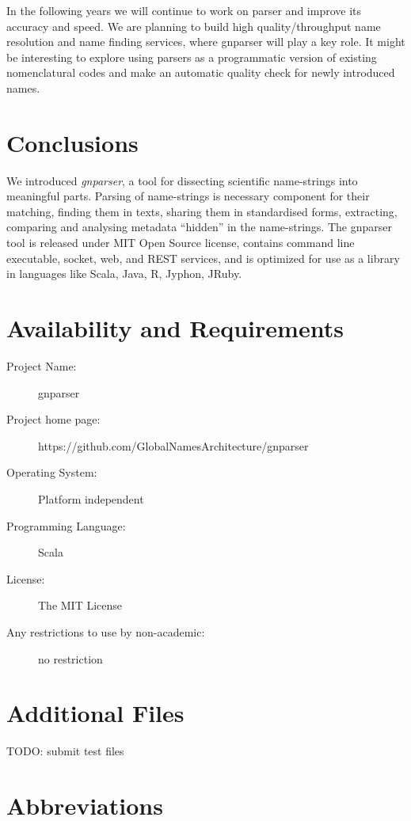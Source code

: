 \documentclass{bmcart}
\begin{document}
In the following years we will continue to work on parser and improve its
accuracy and speed. We are planning to build high quality/throughput name
resolution and name finding services, where gnparser will play a key role.
It might be interesting to explore using parsers as a programmatic version
of existing nomenclatural codes and make an automatic quality check for newly
introduced names.

\section*{Conclusions}

We introduced \textit{gnparser}, a tool for dissecting scientific name-strings
into meaningful parts. Parsing of name-strings is necessary component for their
matching, finding them in texts, sharing them in standardised forms,
extracting, comparing and analysing metadata ``hidden'' in the name-strings.
The gnparser tool is released under MIT Open Source license, contains command
line executable, socket, web, and REST services, and is optimized for use as a
library in languages like Scala, Java, R, Jyphon, JRuby.

\section*{Availability and Requirements}

\begin{description}
  \item[Project Name:] gnparser
  \item[Project home page:] https://github.com/GlobalNamesArchitecture/gnparser
  \item[Operating System:] Platform independent
  \item[Programming Language:] Scala
  \item[License:] The MIT License
  \item[Any restrictions to use by non-academic:] no restriction
\end{description}

\section*{Additional Files}

TODO: submit test files

\section*{Abbreviations}
\end{document}
